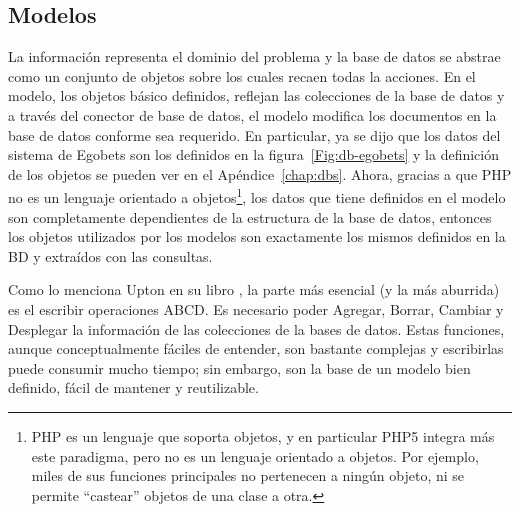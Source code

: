 		 \subsection{Modelos} 
		
		La información representa el dominio del problema y la base de datos se abstrae como un conjunto de objetos sobre los cuales recaen todas la acciones. En el modelo, los objetos básico definidos, reflejan las colecciones de la base de datos y a través del conector de base de datos, el modelo modifica los documentos en la base de datos conforme sea requerido.
		En particular, ya se dijo que los datos del sistema de Egobets son los definidos en la figura~\ref{Fig:db-egobets} y la definición de los objetos se pueden ver en el Apéndice~\ref{chap:dbs}. Ahora, gracias a que PHP no es un lenguaje orientado a objetos\footnote{PHP es un lenguaje que soporta objetos, y en particular PHP5 integra más este paradigma, pero no es un lenguaje orientado a objetos. Por ejemplo, miles de sus funciones principales no pertenecen a ningún objeto, ni se permite ``castear'' objetos de una clase a otra.}, los datos que tiene definidos en el modelo son completamente dependientes de la estructura de la base de datos, entonces los objetos utilizados por los modelos son exactamente los mismos definidos en la BD y extraídos con las consultas.
		
		Como lo menciona Upton en su libro \cite{upton2007codeigniter}, la parte más esencial (y la más aburrida) es el escribir operaciones ABCD.  Es necesario poder Agregar, Borrar, Cambiar y Desplegar la información de las colecciones de la bases de datos. Estas funciones, aunque conceptualmente fáciles de entender, son bastante complejas y escribirlas puede consumir mucho tiempo; sin embargo, son la base de un modelo bien definido, fácil de mantener y reutilizable.
		
